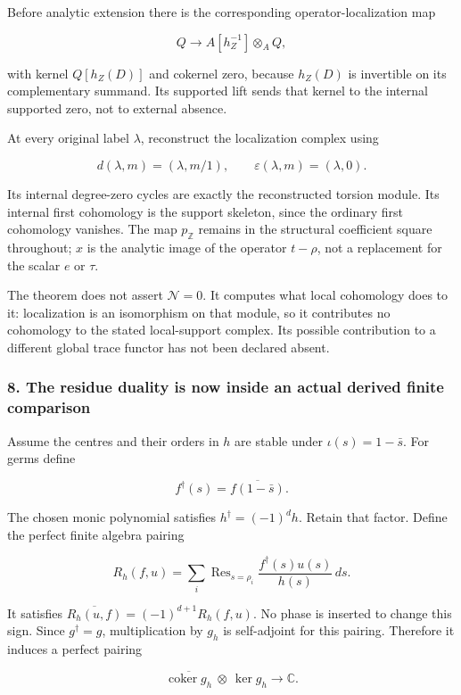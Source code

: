 Before analytic extension there is the corresponding operator-localization map

\[Q\longrightarrow A[h_Z^{-1}]\otimes_AQ,\]

with kernel \(Q[h_Z(D)]\) and cokernel zero, because \(h_Z(D)\) is invertible on its complementary
summand. Its supported lift sends that kernel to the internal supported zero, not to external
absence.

At every original label \(\lambda\), reconstruct the localization complex using

\[d(\lambda,m)=(\lambda,m/1),\qquad
\varepsilon(\lambda,m)=(\lambda,0).\]

Its internal degree-zero cycles are exactly the reconstructed torsion module. Its internal first
cohomology is the support skeleton, since the ordinary first cohomology vanishes. The map
\(p_{\mathbb Z}\) remains in the structural coefficient square throughout; \(x\) is the analytic
image of the operator \(t-\rho\), not a replacement for the scalar \(e\) or \(\tau\).

The theorem does not assert \(\mathcal N=0\). It computes what local cohomology does to it:
localization is an isomorphism on that module, so it contributes no cohomology to the stated
local-support complex. Its possible contribution to a different global trace functor has not been
declared absent.

\subsubsection{8. The residue duality is now inside an actual derived finite
comparison}\label{pr_8:the-residue-duality-is-now-inside-an-actual-derived-finite-comparison}

Assume the centres and their orders in \(h\) are stable under \(\iota(s)=1-\bar s\). For germs
define

\[f^\dagger(s)=\overline{f(1-\bar s)}.\]

The chosen monic polynomial satisfies \(h^\dagger=(-1)^d h\). Retain that factor. Define the perfect
finite algebra pairing

\[R_h(f,u)=\sum_i\operatorname{Res}_{s=\rho_i}
\frac{f^\dagger(s)u(s)}{h(s)}\,ds.\]

It satisfies \(\overline{R_h(u,f)}=(-1)^{d+1}R_h(f,u)\). No phase is inserted to change this sign.
Since \(g^\dagger=g\), multiplication by \(g_h\) is self-adjoint for this pairing. Therefore it
induces a perfect pairing

\[\boxed{\overline{\operatorname{coker}g_h}\ \otimes\ \ker g_h
\longrightarrow\mathbb C.}\]

